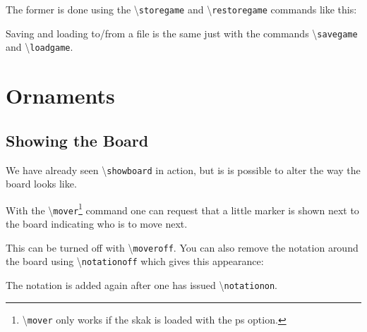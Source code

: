 \documentclass[10pt]{article}
\makeatletter
\renewcommand\showboard{\print@board}
\let\ORIshowboard\showboard
\renewcommand\showboard{%
    \makebox[8\squarelength]{%
    \rule{0pt}{9\squarelength}%
    \begin{postscript}%
    [trim = \squarelength{} 0pt \squarelength{} 0pt]
    \ORIshowboard
    \end{postscript}}}
\newcommand{\package}[1]{\textsf{#1}}
\newcommand{\command}[1]{\textbackslash\texttt{#1}}
\makeatother
\begin{document}
The former is done using the \command{storegame} and
\command{restoregame} commands like this:

\begin{LTXexample}
\newgame
{}

\showboard
{}

\showboard
\end{LTXexample}


Saving and loading to/from a file is the same just with the commands
\command{savegame} and \command{loadgame}.


\section{Ornaments}
\label{sec:ornaments}



\subsection{Showing the Board}
\label{sec:showing-board}

We have already seen \command{showboard} in action, but is is possible
to alter the way the board looks like.

With the \command{mover}\footnote{\command{mover} only works if the \package{skak} is loaded with the ps option.} command one can request that a little marker
is shown next to the board indicating who is to move next.

\begin{LTXexample}
\newgame

\showboard

\end{LTXexample}

\begin{LTXexample}%


\showboard
\end{LTXexample}

This can be turned off with \command{moveroff}. You can also remove
the notation around the board using \command{notationoff} which gives
this appearance:

\begin{LTXexample}
\newgame
\notationoff
\showboard

\end{LTXexample}

The notation is added again after one has issued
\command{notationon}. \notationon
\end{document}
